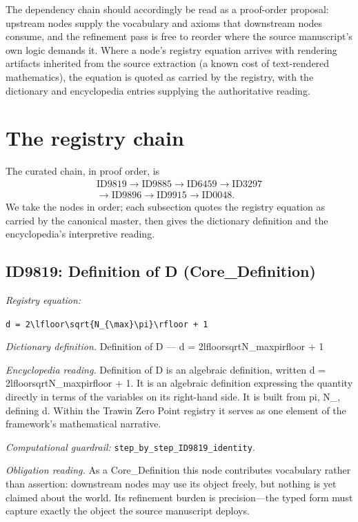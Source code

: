 \documentclass[11pt]{article}
\theoremstyle{remark}
\begin{document}
The dependency chain should accordingly be read as a proof-order proposal: upstream nodes supply the vocabulary and axioms that downstream nodes consume, and the refinement pass is free to reorder where the source manuscript's own logic demands it. Where a node's registry equation arrives with rendering artifacts inherited from the source extraction (a known cost of text-rendered mathematics), the equation is quoted as carried by the registry, with the dictionary and encyclopedia entries supplying the authoritative reading.

\section{The registry chain}
\label{sec:chain}

The curated chain, in proof order, is
\begin{equation*}
\begin{gathered}
\text{ID9819} \to \text{ID9885} \to \text{ID6459} \to \text{ID3297} \\
\to \text{ID9896} \to \text{ID9915} \to \text{ID0048}.
\end{gathered}
\end{equation*}
We take the nodes in order; each subsection quotes the registry equation as carried by the canonical master, then gives the dictionary definition and the encyclopedia's interpretive reading.

\subsection{ID9819: Definition of D (Core\_Definition)}

\noindent\textit{Registry equation:}\par
{\small\texttt{d = 2\textbackslash{}lfloor\textbackslash{}sqrt\{N\_\{\textbackslash{}max\}\textbackslash{}pi\}\textbackslash{}rfloor + 1}}\par\medskip
\noindent\textit{Dictionary definition.} Definition of D --- d = 2lfloorsqrtN\_maxpirfloor + 1\par\medskip
\noindent\textit{Encyclopedia reading.} Definition of D is an algebraic definition, written d = 2lfloorsqrtN\_maxpirfloor + 1. It is an algebraic definition expressing the quantity directly in terms of the variables on its right-hand side. It is built from pi, N\_, defining d. Within the Trawin Zero Point registry it serves as one element of the framework's mathematical narrative.
\par\medskip\noindent\textit{Computational guardrail:} \texttt{step\_by\_step\_ID9819\_identity}.
\par\medskip\noindent\textit{Obligation reading.} As a Core\_Definition this node contributes vocabulary rather than assertion: downstream nodes may use its object freely, but nothing is yet claimed about the world. Its refinement burden is precision---the typed form must capture exactly the object the source manuscript deploys.
\end{document}
